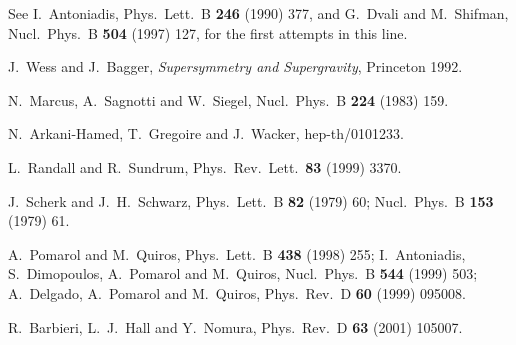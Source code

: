 \documentclass[a4paper,12pt]{article}
\begin{document}
\begin{thebibliography}{99}


See I.~Antoniadis,
Phys.\ Lett.\ B {\bf 246} (1990) 377, and
G.~Dvali and M.~Shifman,
Nucl.\ Phys.\ B {\bf 504} (1997) 127,
for the first attempts in this line.


J.~Wess and J.~Bagger, 
{\it Supersymmetry and Supergravity}, Princeton 1992.




N.~Marcus, A.~Sagnotti and W.~Siegel,
Nucl.\ Phys.\ B {\bf 224} (1983) 159.


N.~Arkani-Hamed, T.~Gregoire and J.~Wacker,
hep-th/0101233.




L.~Randall and R.~Sundrum,
Phys.\ Rev.\ Lett.\  {\bf 83} (1999) 3370.



  J.~Scherk and J.~H.~Schwarz,
Phys.\ Lett.\ B {\bf 82} (1979) 60;
Nucl.\ Phys.\ B {\bf 153} (1979) 61.



A.~Pomarol and M.~Quiros,
Phys.\ Lett.\ B {\bf 438} (1998) 255;
I.~Antoniadis, S.~Dimopoulos, A.~Pomarol and M.~Quiros,
Nucl.\ Phys.\ B {\bf 544} (1999) 503;
A.~Delgado, A.~Pomarol and M.~Quiros,
Phys.\ Rev.\ D {\bf 60} (1999) 095008.



R.~Barbieri, L.~J.~Hall and Y.~Nomura,
Phys.\ Rev.\ D {\bf 63} (2001) 105007.








\end{thebibliography}
\end{document}
